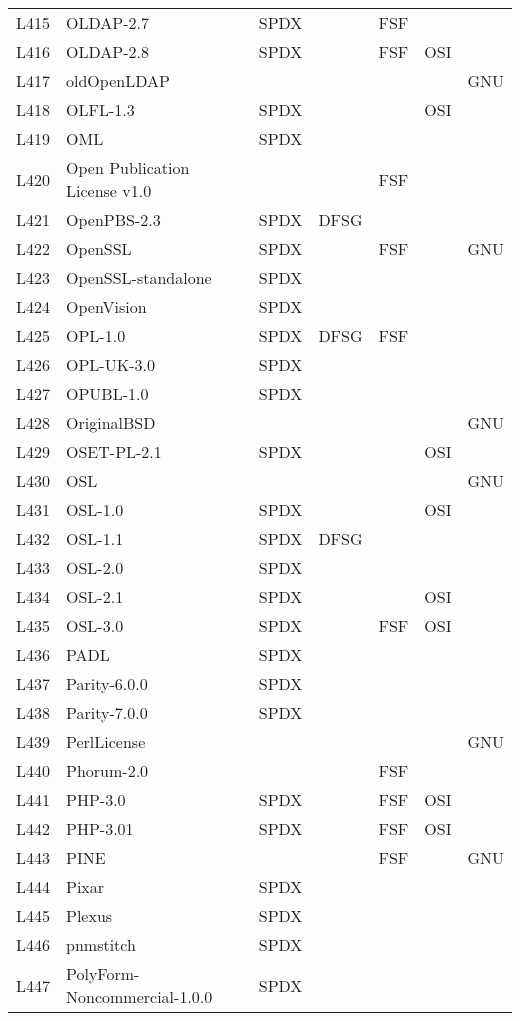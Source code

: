 \begin{longtable}[h]{m{2cm} | m{7cm} | c | c | c | c | c}
L415 & OLDAP-2.7 & SPDX &  & FSF &  &  \\
L416 & OLDAP-2.8 & SPDX &  & FSF & OSI &  \\
L417 & oldOpenLDAP &  &  &  &  & GNU \\
L418 & OLFL-1.3 & SPDX &  &  & OSI &  \\
L419 & OML & SPDX &  &  &  &  \\
L420 & Open Publication License v1.0 &  &  & FSF &  &  \\
L421 & OpenPBS-2.3 & SPDX & DFSG &  &  &  \\
L422 & OpenSSL & SPDX &  & FSF &  & GNU \\
L423 & OpenSSL-standalone & SPDX &  &  &  &  \\
L424 & OpenVision & SPDX &  &  &  &  \\
L425 & OPL-1.0 & SPDX & DFSG & FSF &  &  \\
L426 & OPL-UK-3.0 & SPDX &  &  &  &  \\
L427 & OPUBL-1.0 & SPDX &  &  &  &  \\
L428 & OriginalBSD &  &  &  &  & GNU \\
L429 & OSET-PL-2.1 & SPDX &  &  & OSI &  \\
L430 & OSL &  &  &  &  & GNU \\
L431 & OSL-1.0 & SPDX &  &  & OSI &  \\
L432 & OSL-1.1 & SPDX & DFSG &  &  &  \\
L433 & OSL-2.0 & SPDX &  &  &  &  \\
L434 & OSL-2.1 & SPDX &  &  & OSI &  \\
L435 & OSL-3.0 & SPDX &  & FSF & OSI &  \\
L436 & PADL & SPDX &  &  &  &  \\
L437 & Parity-6.0.0 & SPDX &  &  &  &  \\
L438 & Parity-7.0.0 & SPDX &  &  &  &  \\
L439 & PerlLicense &  &  &  &  & GNU \\
L440 & Phorum-2.0 &  &  & FSF &  &  \\
L441 & PHP-3.0 & SPDX &  & FSF & OSI &  \\
L442 & PHP-3.01 & SPDX &  & FSF & OSI &  \\
L443 & PINE &  &  & FSF &  & GNU \\
L444 & Pixar & SPDX &  &  &  &  \\
L445 & Plexus & SPDX &  &  &  &  \\
L446 & pnmstitch & SPDX &  &  &  &  \\
L447 & PolyForm-Noncommercial-1.0.0 & SPDX &  &  &  &  \\

\end{longtable}
